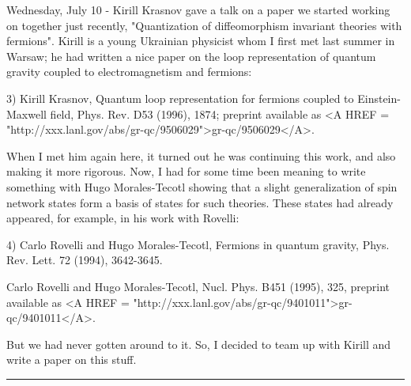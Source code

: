 Wednesday, July 10 - Kirill Krasnov gave a talk on a paper we started
working on together just recently, "Quantization of diffeomorphism
invariant theories with fermions".  Kirill is a young Ukrainian
physicist whom I first met last summer in Warsaw; he had written a
nice paper on the loop representation of quantum gravity coupled to
electromagnetism and fermions:

3) Kirill Krasnov, Quantum loop representation for fermions coupled
to Einstein-Maxwell field, Phys. Rev. D53 (1996), 1874; preprint
available as <A HREF = "http://xxx.lanl.gov/abs/gr-qc/9506029">gr-qc/9506029</A>.

When I met him again here, it turned out he was continuing this work,
and also making it more rigorous.  Now, I had for some time been
meaning to write something with Hugo Morales-Tecotl showing that a
slight generalization of spin network states form a basis of states
for such theories.  These states had already appeared, for example, in
his work with Rovelli:

4) Carlo Rovelli and Hugo Morales-Tecotl, Fermions in quantum 
gravity, Phys. Rev. Lett. 72 (1994), 3642-3645.

Carlo Rovelli and Hugo Morales-Tecotl, Nucl. Phys. B451 (1995), 325,
preprint available as <A HREF = "http://xxx.lanl.gov/abs/gr-qc/9401011">gr-qc/9401011</A>. 

But we had never gotten around to it.  So, I decided to team up with Kirill
and write a paper on this stuff.

\par\noindent\rule{\textwidth}{0.4pt}

